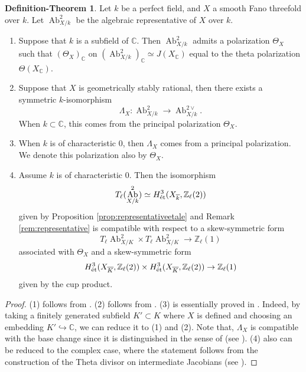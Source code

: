 \documentclass[autodetect-engine, a4paper]{amsart}
\theoremstyle{definition}
\newtheorem{defn-thm}[thm]{Definition-Theorem}
\def\C{{\mathbb C}}
\def\Z{{\mathbb Z}}
\DeclareMathOperator\Ab{\mathrm{Ab}}
\def\et{\mathop{\text{\rm \'et}}}
\begin{document}
\begin{defn-thm}
\label{defn-thm:representativepolarization}
Let $k$ be a perfect field, and $X$ a smooth Fano threefold over $k$. Let $\Ab^2_{X/k}$ be the algebraic representative of $X$ over $k$.
\begin{enumerate}
\item 
Suppose that $k$ is a subfield of $\C$.
Then $\Ab^2_{X/k}$ admits a polarization $\Theta_{X}$ such that $(\Theta_{X})_{\C}$ on $(\Ab^2_{X/k})_{\C} \simeq J(X_{\C})$ equal to the theta polarization $\Theta(X_{\C})$.
\item 
Suppose that $X$ is geometrically stably rational, then there exists a symmetric $k$-isomorphism
\[
\Lambda_{X} \colon \Ab^2_{X/k} \rightarrow \Ab^{2 \vee}_{X/k}.
\]
When $k \subset \C$, this comes from the principal polarization $\Theta_{X}$.
\item 
When $k$ is of characteristic $0$, then $\Lambda_{X}$ comes from a principal polarization. 
We denote this polarization also by $\Theta_{X}$.
\item 
Assume $k$ is of characteristic $0$.
Then the isomorphism 
\[
T_{\ell} (\Ab^2_{X/k}) \simeq H^3_{\et} (X_{\overline{k}}, \Z_{\ell}(2))
\]
given by Proposition \ref{prop:representativeetale} and Remark \ref{rem:representative} is compatible with respect to a skew-symmetric form
\[
T_{\ell} \Ab^2_{X/K}  \times T_{\ell} \Ab^2_{X/K} \rightarrow \Z_{\ell} (1)
\]
associated with $\Theta_{X}$ and a skew-symmetric form
\[
H^3_{\et} (X_{\overline{K}}, \Z_{\ell}(2)) \times H^3_{\et} (X_{\overline{K}}, \Z_{\ell} (2)) \rightarrow
\Z_{\ell} (1)
\]
given by the cup product.
\end{enumerate}
\end{defn-thm}
\begin{proof}
(1) follows from \cite[Example 12.5]{ACMVdecomposition}.
(2) follows from \cite[Theorem 12.12]{ACMVdecomposition}.
(3) is essentially proved in \cite{ACMVdecomposition}.
Indeed, by taking a finitely generated subfield $K' \subset K$ where $X$ is defined and choosing an embedding $K' \hookrightarrow \C$, we can reduce it to (1) and (2). Note that, $\Lambda_{X}$ is compatible with the base change since it is distinguished in the sense of \cite[Section 12]{ACMVdecomposition} (see \cite[Lemma 12.3]{ACMVdecomposition}). 
(4) also can be reduced to the complex case, where the statement follows from the construction of the Theta divisor on intermediate Jacobians (see \cite[Section 3]{Clemens-Griffiths}).
\end{proof}
\end{document}
